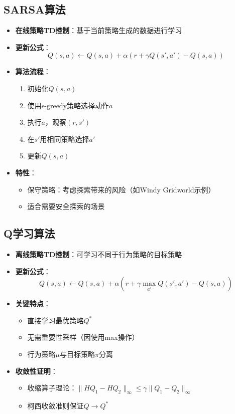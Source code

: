 \subsection{SARSA算法}
\begin{itemize}
    \item \textbf{在线策略TD控制}：基于当前策略生成的数据进行学习
    \item \textbf{更新公式}：
        \[
        Q(s,a) \leftarrow Q(s,a) + \alpha \left( r + \gamma Q(s',a') - Q(s,a) \right)
        \]
    \item \textbf{算法流程}：
        \begin{enumerate}
            \item 初始化$Q(s,a)$
            \item 使用$\epsilon$-greedy策略选择动作$a$
            \item 执行$a$，观察$(r,s')$
            \item 在$s'$用相同策略选择$a'$
            \item 更新$Q(s,a)$
        \end{enumerate}
    \item \textbf{特性}：
        \begin{itemize}
            \item 保守策略：考虑探索带来的风险（如Windy Gridworld示例）
            \item 适合需要安全探索的场景
        \end{itemize}
\end{itemize}

\subsection{Q学习算法}
\begin{itemize}
    \item \textbf{离线策略TD控制}：可学习不同于行为策略的目标策略
    \item \textbf{更新公式}：
        \[
        Q(s,a) \leftarrow Q(s,a) + \alpha \left( r + \gamma \max_{a'} Q(s',a') - Q(s,a) \right)
        \]
    \item \textbf{关键特点}：
        \begin{itemize}
            \item 直接学习最优策略$Q^*$
            \item 无需重要性采样（因使用max操作）
            \item 行为策略$\mu$与目标策略$\pi$分离
        \end{itemize}
    \item \textbf{收敛性证明}：
        \begin{itemize}
            \item 收缩算子理论：$\|HQ_1-HQ_2\|_\infty \leq \gamma\|Q_1-Q_2\|_\infty$
            \item 柯西收敛准则保证$Q\rightarrow Q^*$
        \end{itemize}
\end{itemize}

